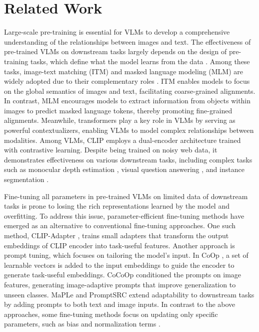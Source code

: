 \section{Related Work}
\label{sec:relatedworks}

Large-scale pre-training is essential for VLMs to develop a comprehensive understanding of the relationships between images and text. The effectiveness of pre-trained VLMs on downstream tasks largely depends on the design of pre-training tasks, which define what the model learns from the data \cite{du2022survey}. Among these tasks, image-text matching (ITM) and masked language modeling (MLM) are widely adopted due to their complementary roles \cite{li2019visualbert, kim2021vilt, li2021align, bao2022vlmo}. ITM enables models to focus on the global semantics of images and text, facilitating coarse-grained alignments. In contrast, MLM encourages models to extract information from objects within images to predict masked language tokens, thereby promoting fine-grained alignments. Meanwhile, transformers \cite{vaswani2017attention} play a key role in VLMs by serving as powerful contextualizers, enabling VLMs to model complex relationships between modalities. Among VLMs, CLIP \cite{radford2021clip} employs a dual-encoder architecture trained with contrastive learning. Despite being trained on noisy web data, it demonstrates effectiveness on various downstream tasks, including complex tasks such as monocular depth estimation \cite{auty2023learning}, visual question answering \cite{song2022clip}, and instance segmentation \cite{ding2022open}.

 Fine-tuning all parameters in pre-trained VLMs on limited data of downstream tasks is prone to losing the rich representations learned by the model and overfitting. To address this issue, parameter-efficient fine-tuning methods have emerged as an alternative to conventional fine-tuning approaches. One such method, CLIP-Adapter \cite{gao2024clip}, trains small adapters that transform the output embeddings of CLIP encoder into task-useful features. Another approach is prompt tuning, which focuses on tailoring the model’s input. In CoOp \cite{zhou2022learning}, a set of learnable vectors is added to the input embeddings to guide the encoder to generate task-useful embeddings. CoCoOp \cite{zhou2022conditional} conditioned the prompts on image features, generating image-adaptive prompts that improve generalization to unseen classes. MaPLe \cite{khattak2023maple} and PromptSRC \cite{khattak2023promptsrc} extend adaptability to downstream tasks by adding prompts to both text and image inputs. In contrast to the above approaches, some fine-tuning methods focus on updating only specific parameters, such as bias and normalization terms \cite{song2022clip}.

